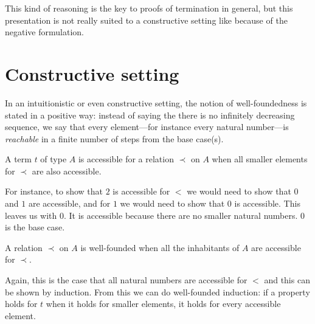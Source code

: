 This kind of reasoning is the key to proofs of termination in general, but this
presentation is not really suited to a constructive setting like \Coq because of
the negative formulation.

\section{Constructive setting}

In an intuitionistic or even constructive setting, the notion of
well-foundedness is stated in a positive way: instead of saying the there is no
infinitely decreasing sequence, we say that every element---for instance every
natural number---is \emph{reachable} in a finite number of steps from the base
case(s).

\begin{definition}[Accessibility]
  A term \(t\) of type \(A\) is accessible for a relation \(\prec\) on \(A\)
  when all smaller elements for \(\prec\) are also accessible.
\end{definition}

For instance, to show that \(2\) is accessible for \(<\) we would need to show
that \(0\) and \(1\) are accessible, and for \(1\) we would need to show that
\(0\) is accessible. This leaves us with \(0\). It is accessible because there
are no smaller natural numbers. \(0\) is the base case.

\begin{definition}
  A relation \(\prec\) on \(A\) is well-founded when all the inhabitants of
  \(A\) are accessible for \(\prec\).
\end{definition}

Again, this is the case that all natural numbers are accessible for \(<\)
and this can be shown by induction.
From this we can do well-founded induction: if a property holds for \(t\) when
it holds for smaller elements, it holds for every accessible element.

